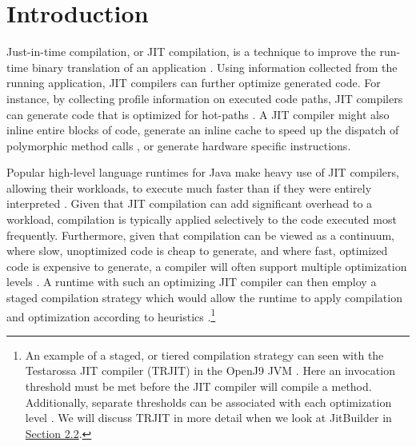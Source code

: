 \section{Introduction}
\label{sec:introduction}
Just-in-time compilation, or JIT compilation, is a technique to improve the run-time binary translation of an application \cite{Aycock:2003:BHJ:857076.857077}.
Using information collected from the running application, JIT compilers can further optimize generated code.
For instance, by collecting profile information on executed code paths, JIT compilers can generate code that is optimized for hot-paths \cite{Smith:2005:VMV:1204009}.
A JIT compiler might also inline entire blocks of code, generate an inline cache to speed up the dispatch of polymorphic method calls \cite{picPaper}, or generate hardware specific instructions.

Popular high-level language runtimes for Java make heavy use of JIT compilers, allowing their workloads, to execute much faster than if they were entirely interpreted \cite{HiPerfJava}.
Given that JIT compilation can add significant overhead to a workload, compilation is typically applied selectively to the code executed most frequently.
Furthermore, given that compilation can be viewed as a continuum, where slow, unoptimized code is cheap to generate, and where fast, optimized code is expensive to generate, a compiler will often support multiple optimization levels \cite{Smith:2005:VMV:1204009}.
A runtime with such an optimizing JIT compiler can then employ a staged compilation strategy which would allow the runtime to apply compilation and optimization according to heuristics \cite{dynamo}.\footnote{
    An example of a staged, or tiered compilation strategy can seen with the Testarossa JIT compiler (TRJIT) in the OpenJ9 JVM \cite{eclipseOMR,TRJITOptimize}.
    Here an invocation threshold must be met before the JIT compiler will compile a method.
    Additionally, separate thresholds can be associated with each optimization level \cite{TRJitLevels}.
    We will discuss TRJIT in more detail when we look at JitBuilder in \hyperref[sec:jitbuilder]{Section 2.2}.
    }

